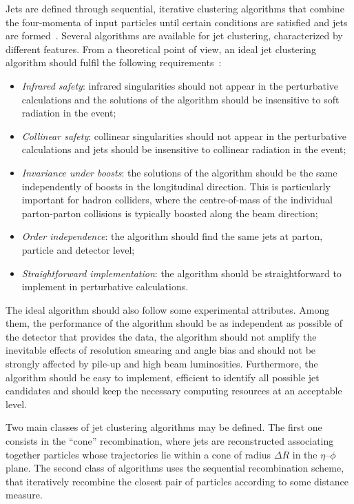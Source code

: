Jets are defined through sequential, iterative clustering algorithms that combine the four-momenta of input particles until certain conditions are satisfied and jets are formed~\cite{Salam:2009jx}. Several algorithms are available for jet clustering, characterized by different features. From a theoretical point of view, an ideal jet clustering algorithm should fulfil the following requirements~\cite{Blazey:2000qt}:
\begin{itemize}
\item \emph{Infrared safety}: infrared singularities should not appear in the perturbative calculations and the solutions of the algorithm should be insensitive to soft radiation in the event;
\item \emph{Collinear safety}: collinear singularities should not appear in the perturbative calculations and jets should be insensitive to collinear radiation in the event;
\item \emph{Invariance under boosts}: the solutions of the algorithm should be the same independently of boosts in the longitudinal direction. This is particularly important for hadron colliders, where the centre-of-mass of the individual parton-parton collisions is typically boosted along the beam direction;
\item \emph{Order independence}: the algorithm should find the same jets at parton, particle and detector level;
\item \emph{Straightforward implementation}: the algorithm should be straightforward to implement in perturbative calculations.
\end{itemize}
The ideal algorithm should also follow some experimental attributes. Among them, the performance of the algorithm should be as independent as possible of the detector that provides the data, the algorithm should not amplify the inevitable effects of resolution smearing and angle bias and should not be strongly affected by pile-up and high beam luminosities. Furthermore, the algorithm should be easy to implement, efficient to identify all possible jet candidates and should keep the necessary computing resources at an acceptable level.

Two main classes of jet clustering algorithms may be defined. The first one consists in the ``cone'' recombination, where jets are reconstructed associating together particles whose trajectories lie within a cone of radius $\Delta R$ in the $\eta$--$\phi$ plane. The second class of algorithms uses the sequential recombination scheme, that iteratively recombine the closest pair of particles according to some distance measure.

